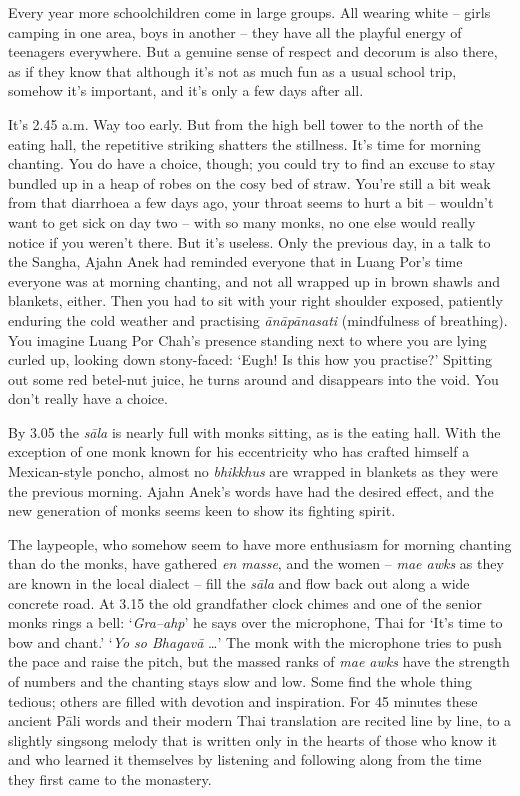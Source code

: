 Every year more schoolchildren come in large groups. All wearing white
-- girls camping in one area, boys in another -- they have all the
playful energy of teenagers everywhere. But a genuine sense of respect
and decorum is also there, as if they know that although it's not as
much fun as a usual school trip, somehow it's important, and it's only a
few days after all. 

It's 2.45 a.m. Way too early. But from the high bell tower to the north
of the eating hall, the repetitive striking shatters the stillness. It's
time for morning chanting. You do have a choice, though; you could try
to find an excuse to stay bundled up in a heap of robes on the cosy bed
of straw. You're still a bit weak from that diarrhoea a few days ago, 
your throat seems to hurt a bit -- wouldn't want to get sick on day two
-- with so many monks, no one else would really notice if you weren't
there. But it's useless. Only the previous day, in a talk to the Sangha,
Ajahn Anek had reminded everyone that in Luang Por's time everyone was
at morning chanting, and not all wrapped up in brown shawls and
blankets, either. Then you had to sit with your right shoulder exposed, 
patiently enduring the cold weather and practising \emph{ānāpānasati}
 (mindfulness of breathing). You imagine Luang Por Chah's presence
standing next to where you are lying curled up, looking down
stony-faced: `Eugh! Is this how you practise?' Spitting out some red
betel-nut juice, he turns around and disappears into the void. You don't
really have a choice. 

By 3.05 the \emph{sāla} is nearly full with monks sitting, as is the eating
hall. With the exception of one monk known for his eccentricity who has
crafted himself a Mexican-style poncho, almost no \emph{bhikkhus} are wrapped
in blankets as they were the previous morning. Ajahn Anek's words have
had the desired effect, and the new generation of monks seems keen to
show its fighting spirit. 

The laypeople, who somehow seem to have more enthusiasm for morning
chanting than do the monks, have gathered \emph{en masse}, and the women
-- \emph{mae awks} as they are known in the local dialect -- fill the
\emph{sāla} and flow back out along a wide concrete road. At 3.15 the old
grandfather clock chimes and one of the senior monks rings a bell: 
`\emph{Gra--ahp}' he says over the microphone, Thai for `It's time to
bow and chant.' `\emph{Yo so Bhagavā} \ldots{}' The monk with the
microphone tries to push the pace and raise the pitch, but the massed
ranks of \emph{mae awks} have the strength of numbers and the chanting
stays slow and low. Some find the whole thing tedious; others are filled
with devotion and inspiration. For 45 minutes these ancient Pāli words
and their modern Thai translation are recited line by line, to a
slightly singsong melody that is written only in the hearts of those who
know it and who learned it themselves by listening and following along
from the time they first came to the monastery. 


